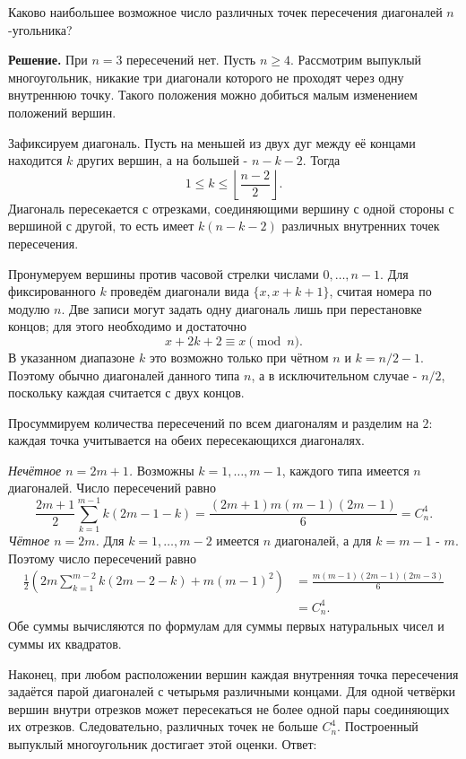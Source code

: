 \begin{problems}
\item Каково наибольшее возможное число различных точек пересечения диагоналей $n$-угольника?
\par\smallskip\noindent\textbf{Решение.} При $n=3$ пересечений нет. Пусть $n\ge4$. Рассмотрим выпуклый многоугольник, никакие три диагонали которого не проходят через одну внутреннюю точку. Такого положения можно добиться малым изменением положений вершин.
\par Зафиксируем диагональ. Пусть на меньшей из двух дуг между её концами находится $k$ других вершин, а на большей - $n-k-2$. Тогда
\[
1\le k\le\left\lfloor\frac{n-2}{2}\right\rfloor.
\]
Диагональ пересекается с отрезками, соединяющими вершину с одной стороны с вершиной с другой, то есть имеет $k(n-k-2)$ различных внутренних точек пересечения.
\par Пронумеруем вершины против часовой стрелки числами $0,\ldots,n-1$. Для фиксированного $k$ проведём диагонали вида $\{x,x+k+1\}$, считая номера по модулю $n$. Две записи могут задать одну диагональ лишь при перестановке концов; для этого необходимо и достаточно
\[
x+2k+2\equiv x\pmod n.
\]
В указанном диапазоне $k$ это возможно только при чётном $n$ и $k=n/2-1$. Поэтому обычно диагоналей данного типа $n$, а в исключительном случае - $n/2$, поскольку каждая считается с двух концов.
\par Просуммируем количества пересечений по всем диагоналям и разделим на $2$: каждая точка учитывается на обеих пересекающихся диагоналях.
\par\textit{Нечётное $n=2m+1$.} Возможны $k=1,\ldots,m-1$, каждого типа имеется $n$ диагоналей. Число пересечений равно
\[
\frac{2m+1}{2}\sum_{k=1}^{m-1}k(2m-1-k)
=\frac{(2m+1)m(m-1)(2m-1)}{6}
=C_n^4.
\]
\textit{Чётное $n=2m$.} Для $k=1,\ldots,m-2$ имеется $n$ диагоналей, а для $k=m-1$ - $m$. Поэтому число пересечений равно
\[
\begin{aligned}
\frac12\left(2m\sum_{k=1}^{m-2}k(2m-2-k)+m(m-1)^2\right)
&=\frac{m(m-1)(2m-1)(2m-3)}{6}\\
&=C_n^4.
\end{aligned}
\]
Обе суммы вычисляются по формулам для суммы первых натуральных чисел и суммы их квадратов.
\par Наконец, при любом расположении вершин каждая внутренняя точка пересечения задаётся парой диагоналей с четырьмя различными концами. Для одной четвёрки вершин внутри отрезков может пересекаться не более одной пары соединяющих их отрезков. Следовательно, различных точек не больше $C_n^4$. Построенный выпуклый многоугольник достигает этой оценки. Ответ:

\end{problems}
